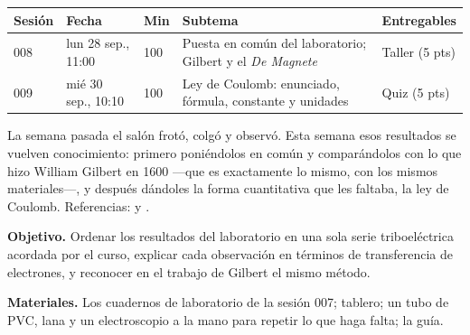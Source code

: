 \documentclass[11pt]{article}
\begin{document}
\encabezado*

\begin{center}
{\renewcommand{\arraystretch}{1.3}
\begin{tabularx}{\linewidth}{@{}l l l X l@{}}
  \toprule
  \textbf{Sesión} & \textbf{Fecha} & \textbf{Min} & \textbf{Subtema} & \textbf{Entregables}\\
  \midrule
  008 & lun 28 sep., 11:00 & 100 & Puesta en común del laboratorio; Gilbert y el
        \emph{De Magnete} & Taller (5 pts)\\
  009 & mié 30 sep., 10:10 & 100 & Ley de Coulomb: enunciado, fórmula, constante y unidades
      & Quiz (5 pts)\\
  \bottomrule
\end{tabularx}}
\end{center}

La semana pasada el salón frotó, colgó y observó. Esta semana esos resultados se vuelven
conocimiento: primero poniéndolos en común y comparándolos con lo que hizo William Gilbert en
1600 —que es exactamente lo mismo, con los mismos materiales—, y después dándoles la forma
cuantitativa que les faltaba, la ley de Coulomb. Referencias:
 y .


\textbf{Objetivo.} Ordenar los resultados del laboratorio en una sola serie triboeléctrica
acordada por el curso, explicar cada observación en términos de transferencia de electrones, y
reconocer en el trabajo de Gilbert el mismo método.

\textbf{Materiales.} Los cuadernos de laboratorio de la sesión 007; tablero; un tubo de PVC,
lana y un electroscopio a la mano para repetir lo que haga falta; la guía.
\end{document}
